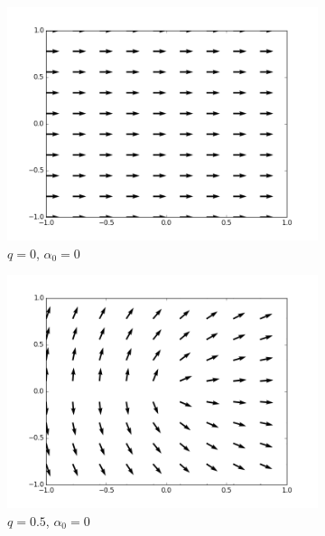 \documentclass[11pt,a4paper]{article}
\numberwithin{equation}{section}
\begin{document}
\begin{figure}[H]
	\begin{subfigure}[H]{0.24\textwidth}
		\centering
		\includegraphics[width=\textwidth]{qplate(0).png}
		\caption{$q=0$, $\alpha_0=0$}
		\label{fig:q0}
	\end{subfigure}
	\hfil
	\begin{subfigure}[H]{0.24\textwidth}
		\centering
		\includegraphics[width=\textwidth]{qplate(0.5).png}
		\caption{$q=0.5$, $\alpha_0=0$}
		\label{fig:q0.5}
	\end{subfigure}
	\hfil
	\begin{subfigure}[H]{0.24\textwidth}
		\centering

\end{subfigure}
\end{figure}
\end{document}
